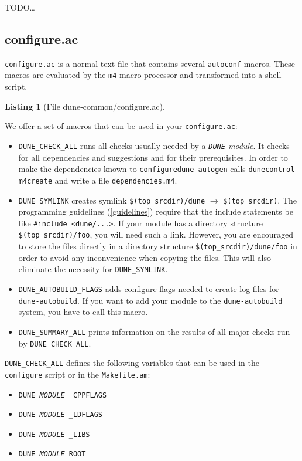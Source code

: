 \documentclass[11pt,a4paper,headinclude,footinclude,DIV16,normalheadings]{scrartcl}
\newtheorem{lst}{Listing}
\newcommand{\dune}{\texttt{DUNE}\xspace}
\newcommand{\autoconf}{\texttt{autoconf}\xspace}
\newcommand{\autogen}{\texttt{dune-autogen}\xspace}
\newcommand{\configure}{\texttt{configure}\xspace}
\newcommand{\configureac}{\texttt{configure.ac}\xspace}
\newcommand{\makefileam}{\texttt{Makefile.am}\xspace}
\newcommand{\topsrc}{\$(top\_srcdir)}
\begin{document}
TODO\dots{}

\subsection{configure.ac}
\label{configure.ac}

\configureac  is a normal text file that contains several \autoconf
macros. These macros are evaluated by the \texttt{m4} macro processor
and transformed into a shell script.

\begin{lst}[File dune-common/configure.ac] \mbox{}

\end{lst}

We offer a set of macros that can be used in your \configureac:

\begin{itemize}
\item \texttt{DUNE\_CHECK\_ALL}
  runs all checks usually needed by a {\em \dune module}.
  It checks for all dependencies and suggestions and for their
  prerequisites.
  In order to make the dependencies known to \configure \autogen calls
  \texttt{dunecontrol m4create} and write a file
  \texttt{dependencies.m4}.
\item \texttt{DUNE\_SYMLINK}
  creates symlink \texttt{\$(top\_srcdir)/dune} $\!\rightarrow$
  \texttt{\$(top\_srcdir)}. The programming guidelines (\ref{guidelines})
  require that the include statements be like \texttt{\#include
    <dune/...>}. If your module has a directory structure
  \texttt{\topsrc/foo}, you will need such a link. However, you are
  encouraged to store the files directly in a directory structure
  \texttt{\topsrc/dune/foo} in order to avoid any inconvenience when
  copying the files. This will also eliminate the necessity for
  \texttt{DUNE\_SYMLINK}.
\item \texttt{DUNE\_AUTOBUILD\_FLAGS}
  adds configure flags needed to create log files for
  \texttt{dune-autobuild}. If you want to add your module to the
  \texttt{dune-autobuild} system, you have to call this macro.
\item \texttt{DUNE\_SUMMARY\_ALL}
  prints information on the results of all major checks run by
  \texttt{DUNE\_CHECK\_ALL}.
\end{itemize}

\texttt{DUNE\_CHECK\_ALL} defines the following
variables that can be used in the \configure script or in the
\makefileam:

\begin{itemize}
\item \texttt{DUNE\textit{\,MODULE\,}\_CPPFLAGS}
\item \texttt{DUNE\textit{\,MODULE\,}\_LDFLAGS}
\item \texttt{DUNE\textit{\,MODULE\,}\_LIBS}
\item \texttt{DUNE\textit{\,MODULE\,}ROOT}
\end{itemize}
\end{document}
